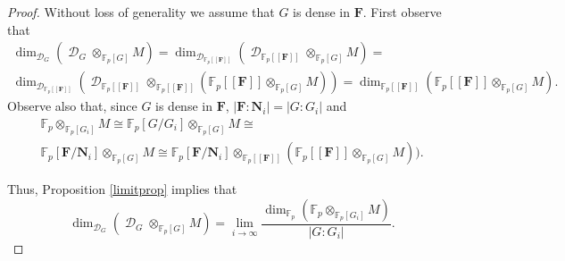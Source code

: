 \documentclass[11pt]{amsart}
\numberwithin{claimcounter}{lem}
\DeclareMathOperator{\D}{\mathcal D}
\newcommand{\F}{\mathbb{F}}
\begin{document}
\begin{proof} Without loss of generality we assume that $G$ is dense in $\mathbf F$.
First observe that
\begin{multline}\label{equa1}
 \dim_{\D_G} ( \D_{G}\otimes_{\F_p[G]} M)=\dim_{\D_{\F_p[[\mathbf F]]}} (\D_{\F_p[ [\mathbf F]]}\otimes_{\F_p[G]} M)=\\
\dim_{\D_{\F_p[[\mathbf F]]}} (\D_{\F_p[ [\mathbf F]]}\otimes _{\F_p[[\mathbf F]]}(\F_p[[\mathbf F]]\otimes_{\F_p[G]} M))=
\dim_{\F_p[[\mathbf F]]} (\F_p[[\mathbf F]]\otimes_{\F_p[G]} M).\end{multline}
Observe also that, since $G$ is dense in $\mathbf F$,  $|\mathbf F: \mathbf N_i|=|G:G_i|$ and
\begin{multline*}\F_p \otimes_{\F_p[ G_i]}M\cong
 \F_p[G/G_i] \otimes_{\F_p[ G]}M\cong \\
  \F_p[\mathbf F/\mathbf N_i] \otimes_{\F_p[G]}M\cong  \F_p[\mathbf F/\mathbf N_i] \otimes_{\F_p[[\mathbf F]]}(\F_p[[\mathbf F]]\otimes_{\F_p[G]} M)).\end{multline*}

Thus,  Proposition \ref{limitprop} implies that
\begin{equation}\label{equa5}  \dim_{\D_G} ( \D_{G}\otimes_{\F_p[G]} M)= \lim_{i\to \infty}\frac{\dim_{\F_p}(\F_p \otimes_{\F_p[ G_i]}M )}{|G:G_i|}.\end{equation}


\end{proof}
\end{document}
